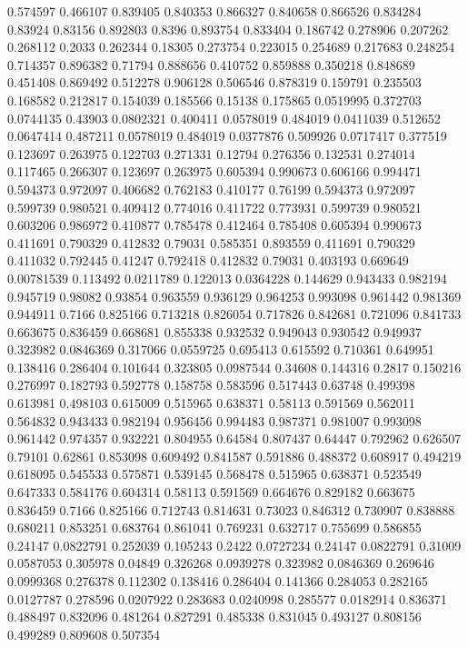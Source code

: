 0.574597 0.466107
0.839405 0.840353
0.866327 0.840658
0.866526 0.834284
0.83924 0.83156
0.892803 0.8396
0.893754 0.833404
0.186742 0.278906
0.207262 0.268112
0.2033 0.262344
0.18305 0.273754
0.223015 0.254689
0.217683 0.248254
0.714357 0.896382
0.71794 0.888656
0.410752 0.859888
0.350218 0.848689
0.451408 0.869492
0.512278 0.906128
0.506546 0.878319
0.159791 0.235503
0.168582 0.212817
0.154039 0.185566
0.15138 0.175865
0.0519995 0.372703
0.0744135 0.43903
0.0802321 0.400411
0.0578019 0.484019
0.0411039 0.512652
0.0647414 0.487211
0.0578019 0.484019
0.0377876 0.509926
0.0717417 0.377519
0.123697 0.263975
0.122703 0.271331
0.12794 0.276356
0.132531 0.274014
0.117465 0.266307
0.123697 0.263975
0.605394 0.990673
0.606166 0.994471
0.594373 0.972097
0.406682 0.762183
0.410177 0.76199
0.594373 0.972097
0.599739 0.980521
0.409412 0.774016
0.411722 0.773931
0.599739 0.980521
0.603206 0.986972
0.410877 0.785478
0.412464 0.785408
0.605394 0.990673
0.411691 0.790329
0.412832 0.79031
0.585351 0.893559
0.411691 0.790329
0.411032 0.792445
0.41247 0.792418
0.412832 0.79031
0.403193 0.669649
0.00781539 0.113492
0.0211789 0.122013
0.0364228 0.144629
0.943433 0.982194
0.945719 0.98082
0.93854 0.963559
0.936129 0.964253
0.993098 0.961442
0.981369 0.944911
0.7166 0.825166
0.713218 0.826054
0.717826 0.842681
0.721096 0.841733
0.663675 0.836459
0.668681 0.855338
0.932532 0.949043
0.930542 0.949937
0.323982 0.0846369
0.317066 0.0559725
0.695413 0.615592
0.710361 0.649951
0.138416 0.286404
0.101644 0.323805
0.0987544 0.34608
0.144316 0.2817
0.150216 0.276997
0.182793 0.592778
0.158758 0.583596
0.517443 0.63748
0.499398 0.613981
0.498103 0.615009
0.515965 0.638371
0.58113 0.591569
0.562011 0.564832
0.943433 0.982194
0.956456 0.994483
0.987371 0.981007
0.993098 0.961442
0.974357 0.932221
0.804955 0.64584
0.807437 0.64447
0.792962 0.626507
0.79101 0.62861
0.853098 0.609492
0.841587 0.591886
0.488372 0.608917
0.494219 0.618095
0.545533 0.575871
0.539145 0.568478
0.515965 0.638371
0.523549 0.647333
0.584176 0.604314
0.58113 0.591569
0.664676 0.829182
0.663675 0.836459
0.7166 0.825166
0.712743 0.814631
0.73023 0.846312
0.730907 0.838888
0.680211 0.853251
0.683764 0.861041
0.769231 0.632717
0.755699 0.586855
0.24147 0.0822791
0.252039 0.105243
0.2422 0.0727234
0.24147 0.0822791
0.31009 0.0587053
0.305978 0.04849
0.326268 0.0939278
0.323982 0.0846369
0.269646 0.0999368
0.276378 0.112302
0.138416 0.286404
0.141366 0.284053
0.282165 0.0127787
0.278596 0.0207922
0.283683 0.0240998
0.285577 0.0182914
0.836371 0.488497
0.832096 0.481264
0.827291 0.485338
0.831045 0.493127
0.808156 0.499289
0.809608 0.507354
